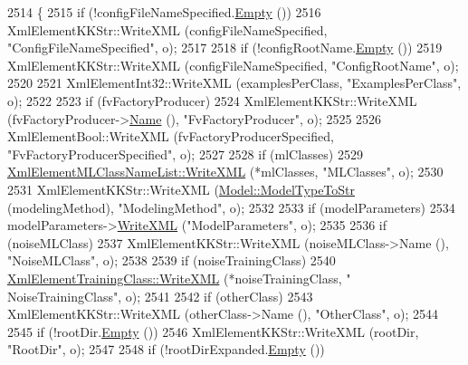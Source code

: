 \begin{DoxyCode}
2514 \{
2515   \textcolor{keywordflow}{if}  (!configFileNameSpecified.\hyperlink{class_k_k_b_1_1_k_k_str_ac69942f73fffd672ec2a6e1c410afdb6}{Empty} ())
2516     XmlElementKKStr::WriteXML (configFileNameSpecified, \textcolor{stringliteral}{"ConfigFileNameSpecified"}, o);
2517 
2518   \textcolor{keywordflow}{if}  (!configRootName.\hyperlink{class_k_k_b_1_1_k_k_str_ac69942f73fffd672ec2a6e1c410afdb6}{Empty} ())
2519     XmlElementKKStr::WriteXML (configFileNameSpecified, \textcolor{stringliteral}{"ConfigRootName"}, o);
2520 
2521   XmlElementInt32::WriteXML (examplesPerClass, \textcolor{stringliteral}{"ExamplesPerClass"}, o);
2522 
2523   \textcolor{keywordflow}{if}  (fvFactoryProducer)
2524     XmlElementKKStr::WriteXML (fvFactoryProducer->\hyperlink{class_k_k_m_l_l_1_1_factory_f_v_producer_adbdfab027b335694c46d969d84ea1213}{Name} (), \textcolor{stringliteral}{"FvFactoryProducer"}, o);
2525 
2526   XmlElementBool::WriteXML (fvFactoryProducerSpecified, \textcolor{stringliteral}{"FvFactoryProducerSpecified"}, o);
2527 
2528   \textcolor{keywordflow}{if}  (mlClasses)
2529     \hyperlink{class_k_k_m_l_l_1_1_xml_element_m_l_class_name_list_a4aa7bfd29f8150ff0d4097646aa9fa77}{XmlElementMLClassNameList::WriteXML} (*mlClasses, \textcolor{stringliteral}{"MLClasses"}, o);
2530 
2531   XmlElementKKStr::WriteXML (\hyperlink{class_k_k_m_l_l_1_1_model_a27f60942199e9bfe1c48eb787089f325}{Model::ModelTypeToStr} (modelingMethod), \textcolor{stringliteral}{"ModelingMethod"},
       o);
2532 
2533   \textcolor{keywordflow}{if}  (modelParameters)
2534     modelParameters->\hyperlink{class_k_k_m_l_l_1_1_model_param_a298652e730d3d28be1e94970a424963c}{WriteXML} (\textcolor{stringliteral}{"ModelParameters"}, o);
2535 
2536   \textcolor{keywordflow}{if}  (noiseMLClass)
2537     XmlElementKKStr::WriteXML (noiseMLClass->Name (), \textcolor{stringliteral}{"NoiseMLClass"}, o);
2538 
2539   \textcolor{keywordflow}{if}  (noiseTrainingClass)
2540       \hyperlink{class_k_k_b_1_1_xml_element_template_aa32ee34673b14ffadd1d80c2960292b1}{XmlElementTrainingClass::WriteXML} (*noiseTrainingClass, \textcolor{stringliteral}{"
      NoiseTrainingClass"}, o);
2541 
2542    \textcolor{keywordflow}{if}  (otherClass)
2543     XmlElementKKStr::WriteXML (otherClass->Name (), \textcolor{stringliteral}{"OtherClass"}, o);
2544 
2545   \textcolor{keywordflow}{if}  (!rootDir.\hyperlink{class_k_k_b_1_1_k_k_str_ac69942f73fffd672ec2a6e1c410afdb6}{Empty} ())
2546     XmlElementKKStr::WriteXML (rootDir, \textcolor{stringliteral}{"RootDir"}, o);
2547 
2548   \textcolor{keywordflow}{if}  (!rootDirExpanded.\hyperlink{class_k_k_b_1_1_k_k_str_ac69942f73fffd672ec2a6e1c410afdb6}{Empty} ())

\end{DoxyCode}
